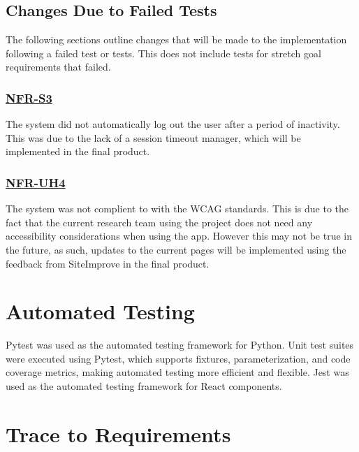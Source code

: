 \documentclass[12pt, titlepage]{article}
\begin{document}
\subsection{Changes Due to Failed Tests}
The following sections outline changes that will be made to the implementation
following a failed test or tests. This does not include tests for stretch goal
requirements that failed.

\subsubsection{\hyperref[NFR:S3]{NFR-S3}} The system did not automatically log
out the user after a period of inactivity. This was due to the lack of a session
timeout manager, which will be implemented in the final product.

\subsubsection{\hyperref[NFR:UH4]{NFR-UH4}} The system was not complient to with
the WCAG standards. This is due to the fact that the current research team using
the project does not need any accessibility considerations when using the app.
However this may not be true in the future, as such, updates to the current
pages will be implemented using the feedback from SiteImprove in the final
product.

\section{Automated Testing}
Pytest was used as the automated testing framework for Python. Unit test suites
were executed using Pytest, which supports fixtures, parameterization, and code
coverage metrics, making automated testing more efficient and flexible. Jest was
used as the automated testing framework for React components.
		
\section{Trace to Requirements}
\end{document}
